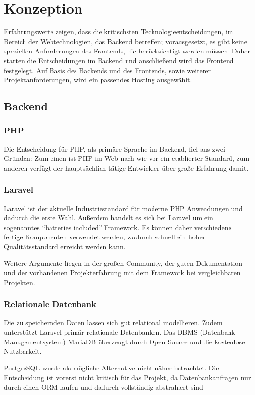 \section{Konzeption}
Erfahrungswerte zeigen, dass die kritischsten Technologieentscheidungen, im Bereich der Webtechnologien, das Backend betreffen;
vorausgesetzt, es gibt keine speziellen Anforderungen des Frontends, die berücksichtigt werden müssen.
Daher starten die Entscheidungen im Backend und anschließend wird das Frontend festgelegt.
Auf Basis des Backends und des Frontends, sowie weiterer Projektanforderungen, wird ein passendes Hosting ausgewählt.

\subsection{Backend}

\subsubsection{PHP}
Die Entscheidung für PHP, als primäre Sprache im Backend, fiel aus zwei Gründen:
Zum einen ist PHP im Web nach wie vor ein etablierter Standard, zum anderen verfügt der hauptsächlich tätige Entwickler über große Erfahrung damit.

\subsubsection{Laravel}
Laravel ist der aktuelle Industriestandard für moderne PHP Anwendungen und dadurch die erste Wahl.
Außerdem handelt es sich bei Laravel um ein sogenanntes \enquote{batteries included} Framework.
Es können daher verschiedene fertige Komponenten verwendet werden, wodurch schnell ein hoher Qualitätsstandard erreicht werden kann.

Weitere Argumente liegen in der großen Community, der guten Dokumentation und der vorhandenen Projekterfahrung mit dem Framework bei vergleichbaren Projekten.

\subsubsection{Relationale Datenbank}
Die zu speichernden Daten lassen sich gut relational modellieren.
Zudem unterstützt Laravel primär relationale Datenbanken.
Das DBMS (Datenbank-Managementsystem) MariaDB überzeugt durch Open Source und die kostenlose Nutzbarkeit.

PostgreSQL wurde als mögliche Alternative nicht näher betrachtet.
Die Entscheidung ist vorerst nicht kritisch für das Projekt, da Datenbankanfragen nur durch einen ORM laufen und dadurch vollständig abstrahiert sind.
\newpage

